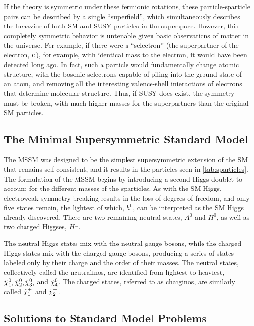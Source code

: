 If the theory is symmetric under these fermionic rotations, these particle-sparticle pairs can be described by a single ``superfield'', which simultaneously describes the behavior of both \ac{SM} and \ac{SUSY} particles in the superspace. However, this completely symmetric behavior is untenable given basic observations of matter in the universe. For example, if there were a ``selectron'' (the superpartner of the electron, $\sle$), for example, with identical mass to the electron, it would have been detected long ago. In fact, such a particle would fundamentally change atomic structure, with the bosonic selectrons capable of piling into the ground state of an atom, and removing all the interesting valence-shell interactions of electrons that determine molecular structure. Thus, if \ac{SUSY} does exist, the symmetry must be broken, with much higher masses for the superpartners than the original \ac{SM} particles. 

\subsection{The Minimal Supersymmetric Standard Model}

The \ac{MSSM} was designed to be the simplest supersymmetric extension of the \ac{SM} that remains self consistent, and it results in the particles seen in \autoref{tab:sparticles}\cite{Martin:1997ns}. The formulation of the \ac{MSSM} begins by introducing a second Higgs doublet to account for the different masses of the sparticles. As with the \ac{SM} Higgs, electroweak symmetry breaking results in the loss of degrees of freedom, and only five states remain, the lightest of which, $h^0$, can be interpreted as the \ac{SM} Higgs already discovered. There are two remaining neutral states, $A^0$ and $H^0$, as well as two charged Higgses, $H^\pm$. 

The neutral Higgs states mix with the neutral gauge bosons, while the charged Higgs states mix with the charged gauge bosons, producing a series of states labeled only by their charge and the order of their masses. The neutral states, collectively called the neutralinos, are identified from lightest to heaviest, $\No[1], \No[2], \No[3],$ and $\No[4]$. The charged states, referred to as charginos, are similarly called $\Co[1]$ and $\Co[2]$.



\subsection{Solutions to Standard Model Problems}


